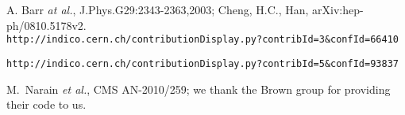\begin{thebibliography}{10}
 A. Barr {\em at al.}, J.Phys.G29:2343-2363,2003;
Cheng, H.C., Han, arXiv:hep-ph/0810.5178v2.\\
{\tt http://indico.cern.ch/contributionDisplay.py?contribId=3\&confId=66410}

 {\tt http://indico.cern.ch/contributionDisplay.py?contribId=5\&confId=93837}

 M.~Narain {\em et al.}, CMS AN-2010/259; we thank the 
Brown group for providing their code to us.


    
\end{thebibliography}
